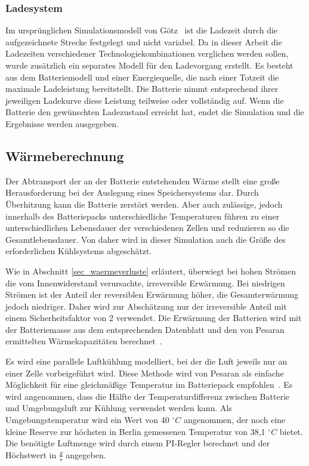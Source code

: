 \subsubsection{Ladesystem}
Im ursprünglichen Simulationsmodell von Götz~\cite{Gotz:2013} ist die Ladezeit durch die aufgezeichnete Strecke festgelegt und nicht variabel. Da in dieser Arbeit die Ladezeiten verschiedener Technologiekombinationen verglichen werden sollen, wurde zusätzlich ein separates Modell für den Ladevorgang erstellt. Es besteht aus dem Batteriemodell und einer Energiequelle, die nach einer Totzeit die maximale Ladeleistung bereitstellt. Die Batterie nimmt entsprechend ihrer jeweiligen Ladekurve diese Leistung teilweise oder vollständig auf. Wenn die Batterie den gewünschten Ladezustand erreicht hat, endet die Simulation und die Ergebnisse werden ausgegeben.

\subsection{Wärmeberechnung}
Der Abtransport der an der Batterie entstehenden Wärme stellt eine große Herausforderung bei der Auslegung eines Speichersystems dar. Durch Überhitzung kann die Batterie zerstört werden. Aber auch zulässige, jedoch innerhalb des Batteriepacks unterschiedliche Temperaturen führen zu einer unterschiedlichen Lebensdauer der verschiedenen Zellen und reduzieren so die Gesamtlebensdauer. Von daher wird in dieser Simulation auch die Größe des erforderlichen Kühlsystems abgeschätzt.

Wie in Abschnitt \ref{sec_waermeverluste} erläutert, überwiegt bei hohen Strömen die vom Innenwiderstand verursachte, irreversible Erwärmung. Bei niedrigen Strömen ist der Anteil der reversiblen Erwärmung höher, die Gesamterwärmung jedoch niedriger. Daher wird zur Abschätzung nur der irreversible Anteil mit einem Sicherheitsfaktor von 2 verwendet. Die Erwärmung der Batterien wird mit der Batteriemasse aus dem entsprechenden Datenblatt und den von Pesaran ermittelten Wärmekapazitäten berechnet~\cite{pesaran2001battery}.

Es wird eine parallele Luftkühlung modelliert, bei der die Luft jeweils nur an einer Zelle vorbeigeführt wird. Diese Methode wird von Pesaran als einfache Möglichkeit für eine gleichmäßige Temperatur im Batteriepack empfohlen~\cite{pesaran2001battery}. Es wird angenommen, dass die Hälfte der Temperaturdifferenz zwischen Batterie und Umgebungsluft zur Kühlung verwendet werden kann. Als Umgebungstemperatur wird ein Wert von 40 $^{\circ}C$ angenommen, der noch eine kleine Reserve zur höchsten in Berlin gemessenen Temperatur von 38,1 $^{\circ}C$ bietet\cite{tempRekord}. Die benötigte Luftmenge wird durch einem PI-Regler berechnet und der Höchstwert in $\frac{g}{s}$ angegeben.

